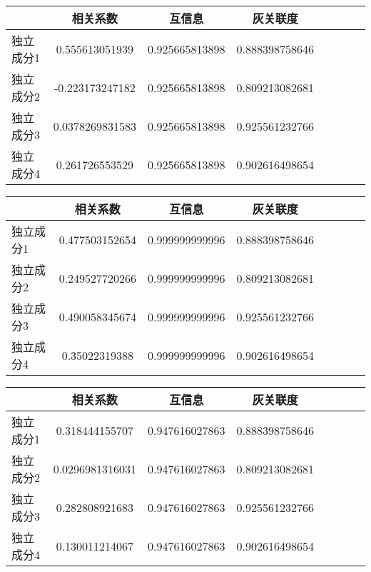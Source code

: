\begin{table}[!tphb]  
\begin{center}
\begin{tabular}{lccclccc} 
 \toprule 
& 相关系数   & 互信息    &灰关联度 \\ 
\midrule 
独立成分1	& 0.555613051939	& 0.925665813898	& 0.888398758646	\\ 
独立成分2	& -0.223173247182	& 0.925665813898	& 0.809213082681	\\ 
独立成分3	& 0.0378269831583	& 0.925665813898	& 0.925561232766	\\ 
独立成分4	& 0.261726553529	& 0.925665813898	& 0.902616498654	\\ 
\bottomrule 
 \end{tabular} 
\end{center} 
 \end{table} 


\begin{table}[!tphb]  
\begin{center}
\begin{tabular}{lccclccc} 
 \toprule 
& 相关系数   & 互信息    &灰关联度 \\ 
\midrule 
独立成分1	& 0.477503152654	& 0.999999999996	& 0.888398758646	\\ 
独立成分2	& 0.249527720266	& 0.999999999996	& 0.809213082681	\\ 
独立成分3	& 0.490058345674	& 0.999999999996	& 0.925561232766	\\ 
独立成分4	& 0.35022319388	& 0.999999999996	& 0.902616498654	\\ 
\bottomrule 
 \end{tabular} 
\end{center} 
 \end{table} 


\begin{table}[!tphb]  
\begin{center}
\begin{tabular}{lccclccc} 
 \toprule 
& 相关系数   & 互信息    &灰关联度 \\ 
\midrule 
独立成分1	& 0.318444155707	& 0.947616027863	& 0.888398758646	\\ 
独立成分2	& 0.0296981316031	& 0.947616027863	& 0.809213082681	\\ 
独立成分3	& 0.282808921683	& 0.947616027863	& 0.925561232766	\\ 
独立成分4	& 0.130011214067	& 0.947616027863	& 0.902616498654	\\ 
\bottomrule 
 \end{tabular} 
\end{center} 
 \end{table} 


